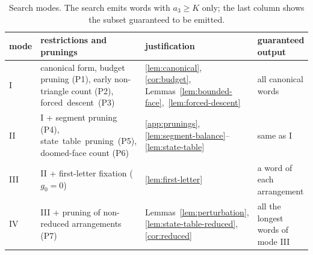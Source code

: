 \begin{table}[tp]
\centering
\small
\begingroup
\setlength{\tabcolsep}{4pt}
\caption{Search modes. The search emits words with $a_3\ge K$ only; the last column shows the subset guaranteed to be emitted.}
\label{tab:modes}
\renewcommand{\arraystretch}{1.2}
\begin{tabular}{l>{\raggedright\arraybackslash}p{5.3cm}>{\raggedright\arraybackslash}p{2.6cm}>{\raggedright\arraybackslash}p{2.65cm}}
\toprule
mode & restrictions and prunings & justification & guaranteed output \\
\midrule
I & canonical form, budget pruning (P1), early non-triangle count (P2), forced~descent~(P3) &\cref{lem:canonical}, \cref{cor:budget}, Lemmas~\ref{lem:bounded-face},~\ref{lem:forced-descent} & all canonical words \\
II & I + segment pruning (P4), state~table~pruning~(P5), doomed-face count (P6) &\cref{app:prunings}, \ref{lem:segment-balance}--\ref{lem:state-table} & same as I \\
III & II + first-letter fixation ($g_0=0$) & \cref{lem:first-letter} & a word of each arrangement \\
IV & III + pruning of non-reduced arrangements (P7) &Lemmas~\ref{lem:perturbation}, \ref{lem:state-table-reduced}, \cref{cor:reduced} & all the longest words of mode III \\
\bottomrule
\end{tabular}
\endgroup


\end{table}
